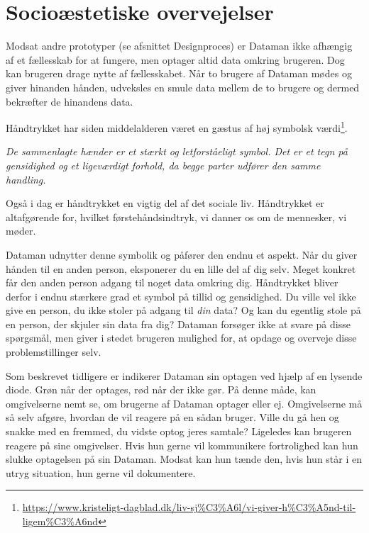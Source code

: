 \section*{Socioæstetiske overvejelser}
Modsat andre prototyper (se afsnittet Designproces) er Dataman ikke afhængig af et fællesskab for at fungere, men optager altid data omkring brugeren. Dog kan brugeren drage nytte af fællesskabet. Når to brugere af Dataman mødes og giver hinanden hånden, udveksles en smule data mellem de to brugere og dermed bekræfter de hinandens data.

Håndtrykket har siden middelalderen været en gæstus af høj symbolsk værdi\footnote{\url{https://www.kristeligt-dagblad.dk/liv-sj\%C3\%A6l/vi-giver-h\%C3\%A5nd-til-ligem\%C3\%A6nd}}.

\begin{displayquote}
\textit{De sammenlagte hænder er et stærkt og letforståeligt symbol. Det er et tegn på gensidighed og et ligeværdigt forhold, da begge parter udfører den samme handling.}
\end{displayquote}

Også i dag er håndtrykket en vigtig del af det sociale liv. Håndtrykket er altafgørende for, hvilket førstehåndsindtryk, vi danner os om de mennesker, vi møder. 

Dataman udnytter denne symbolik og påfører den endnu et aspekt. Når du giver hånden til en anden person, eksponerer du en lille del af dig selv. Meget konkret får den anden person adgang til noget data omkring dig. Håndtrykket bliver derfor i endnu stærkere grad et symbol på tillid og gensidighed. Du ville vel ikke give en person, du ikke stoler på adgang til \textit{din} data? Og kan du egentlig stole på en person, der skjuler sin data fra dig? Dataman forsøger ikke at svare på disse spørgsmål, men giver i stedet brugeren mulighed for, at opdage og overveje disse problemstillinger selv.

Som beskrevet tidligere er indikerer Dataman sin optagen ved hjælp af en lysende diode. Grøn når der optages, rød når der ikke gør. På denne måde, kan omgivelserne nemt se, om brugerne af Dataman optager eller ej. Omgivelserne må så selv afgøre, hvordan de vil reagere på en sådan bruger. Ville du gå hen og snakke med en fremmed, du vidste optog jeres samtale? Ligeledes kan brugeren reagere på sine omgivelser. Hvis hun gerne vil kommunikere fortrolighed kan hun slukke optagelsen på sin Dataman. Modsat kan hun tænde den, hvis hun står i en utryg situation, hun gerne vil dokumentere.

